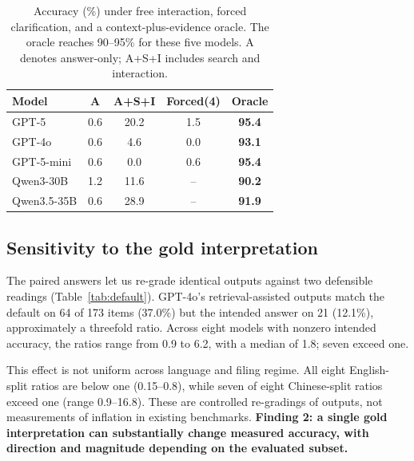 \begin{table}[t]
\centering

\small
\begin{tabular}{lcccc}
\toprule
Model & A & A+S+I & Forced(4) & \textbf{Oracle} \\
\midrule
GPT-5      & 0.6 & 20.2 & 1.5 & \textbf{95.4} \\
GPT-4o     & 0.6 & 4.6  & 0.0 & \textbf{93.1} \\
GPT-5-mini & 0.6 & 0.0  & 0.6 & \textbf{95.4} \\
Qwen3-30B   & 1.2 & 11.6 & -- & \textbf{90.2} \\
Qwen3.5-35B & 0.6 & 28.9 & -- & \textbf{91.9} \\
\bottomrule
\end{tabular}
\caption{Accuracy (\%) under free interaction, forced clarification, and a context-plus-evidence oracle. The oracle reaches 90--95\% for these five models. A denotes answer-only; A+S+I includes search and interaction.}

\label{tab:ceiling}
\end{table}



\subsection{Sensitivity to the gold interpretation}
\label{sec:illusion}

The paired answers let us re-grade identical outputs against two defensible readings (Table~\ref{tab:default}). GPT-4o's retrieval-assisted outputs match the default on 64 of 173 items (37.0\%) but the intended answer on 21 (12.1\%), approximately a threefold ratio. Across eight models with nonzero intended accuracy, the ratios range from 0.9 to 6.2, with a median of 1.8; seven exceed one.

This effect is not uniform across language and filing regime. All eight English-split ratios are below one (0.15--0.8), while seven of eight Chinese-split ratios exceed one (range 0.9--16.8). These are controlled re-gradings of \fininteract outputs, not measurements of inflation in existing benchmarks. \textbf{Finding 2: a single gold interpretation can substantially change measured accuracy, with direction and magnitude depending on the evaluated subset.}

